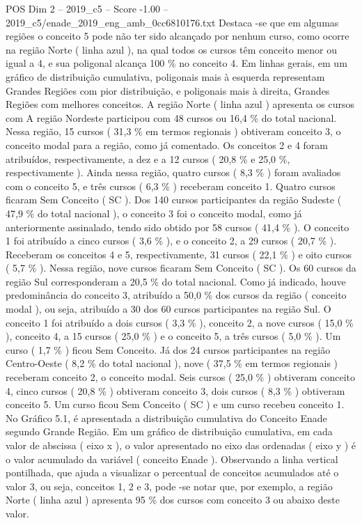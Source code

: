 \begin{textsample}{POS Dim 2 – 2019\_c5 – Score -1.00 – 2019\_c5/enade\_2019\_eng\_amb\_0cc6810176.txt}
Destaca -se que em algumas regiões o conceito 5 pode não ter sido alcançado por nenhum curso, como ocorre na região Norte ( linha azul ), na qual todos os cursos têm conceito menor ou igual a 4, e sua poligonal alcança 100 \% no conceito 4.
Em linhas gerais, em um gráfico de distribuição cumulativa, poligonais mais à esquerda representam Grandes Regiões com pior distribuição, e poligonais mais à direita, Grandes Regiões com melhores conceitos.
A região Norte ( linha azul ) apresenta os cursos com A região Nordeste participou com 48 cursos ou 16,4 \% do total nacional.
Nessa região, 15 cursos ( 31,3 \% em termos regionais ) obtiveram conceito 3, o conceito modal para a região, como já comentado.
Os conceitos 2 e 4 foram atribuídos, respectivamente, a dez e a 12 cursos ( 20,8 \% e 25,0 \%, respectivamente ).
Ainda nessa região, quatro cursos ( 8,3 \% ) foram avaliados com o conceito 5, e três cursos ( 6,3 \% ) receberam conceito 1.
Quatro cursos ficaram Sem Conceito ( SC ).
Dos 140 cursos participantes da região Sudeste ( 47,9 \% do total nacional ), o conceito 3 foi o conceito modal, como já anteriormente assinalado, tendo sido obtido por 58 cursos ( 41,4 \% ).
O conceito 1 foi atribuído a cinco cursos ( 3,6 \% ), e o conceito 2, a 29 cursos ( 20,7 \% ).
Receberam os conceitos 4 e 5, respectivamente, 31 cursos ( 22,1 \% ) e oito cursos ( 5,7 \% ).
Nessa região, nove cursos ficaram Sem Conceito ( SC ).
Os 60 cursos da região Sul corresponderam a 20,5 \% do total nacional.
Como já indicado, houve predominância do conceito 3, atribuído a 50,0 \% dos cursos da região ( conceito modal ), ou seja, atribuído a 30 dos 60 cursos participantes na região Sul.
O conceito 1 foi atribuído a dois cursos ( 3,3 \% ), conceito 2, a nove cursos ( 15,0 \% ), conceito 4, a 15 cursos ( 25,0 \% ) e o conceito 5, a três cursos ( 5,0 \% ).
Um curso ( 1,7 \% ) ficou Sem Conceito.
Já dos 24 cursos participantes na região Centro-Oeste ( 8,2 \% do total nacional ), nove ( 37,5 \% em termos regionais ) receberam conceito 2, o conceito modal.
Seis cursos ( 25,0 \% ) obtiveram conceito 4, cinco cursos ( 20,8 \% ) obtiveram conceito 3, dois cursos ( 8,3 \% ) obtiveram conceito 5.
Um curso ficou Sem Conceito ( SC ) e um curso recebeu conceito 1.
No Gráfico 5.1, é apresentada a distribuição cumulativa do Conceito Enade segundo Grande Região.
Em um gráfico de distribuição cumulativa, em cada valor de abscissa ( eixo x ), o valor apresentado no eixo das ordenadas ( eixo y ) é o valor acumulado da variável ( conceito Enade ).
Observando a linha vertical pontilhada, que ajuda a visualizar o percentual de conceitos acumulados até o valor 3, ou seja, conceitos 1, 2 e 3, pode -se notar que, por exemplo, a região Norte ( linha azul ) apresenta 95 \% dos cursos com conceito 3 ou abaixo deste valor.

\end{textsample}
